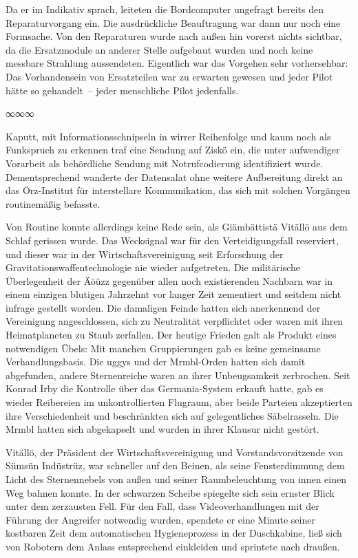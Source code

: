 Da er im Indikativ sprach, leiteten die Bordcomputer ungefragt bereits den Reparaturvorgang ein. Die ausdrückliche Beauftragung war dann nur noch eine Formsache. Von den Reparaturen wurde nach außen hin vorerst nichts sichtbar, da die Ersatzmodule an anderer Stelle aufgebaut wurden und noch keine messbare Strahlung aussendeten. Eigentlich war das Vorgehen sehr vorhersehbar: Das Vorhandensein von Ersatzteilen war zu erwarten gewesen und jeder Pilot hätte so gehandelt~– jeder menschliche Pilot jedenfalls.

\begin{center}
∞∞∞
\end{center}

Kaputt, mit Informationsschnipseln in wirrer Reihenfolge und kaum noch als Funkspruch zu erkennen traf eine Sendung auf Ziskö ein, die unter aufwendiger Vorarbeit als behördliche Sendung mit Notrufcodierung identifiziert wurde. Dementsprechend wanderte der Datensalat ohne weitere Aufbereitung direkt an das Örz-Institut für interstellare Kommunikation, das sich mit solchen Vorgängen routinemäßig befasste.

Von Routine konnte allerdings keine Rede sein, als Giämbättistä Vitällö aus dem Schlaf gerissen wurde. Das Wecksignal war für den Verteidigungsfall reserviert, und dieser war in der Wirtschaftsvereinigung seit Erforschung der Gravitationswaffentechnologie nie wieder aufgetreten. Die militärische Überlegenheit der Äöüzz gegenüber allen noch existierenden Nachbarn war in einem einzigen blutigen Jahrzehnt vor langer Zeit zementiert und seitdem nicht infrage gestellt worden. Die damaligen Feinde hatten sich anerkennend der Vereinigung angeschlossen, sich zu Neutralität verpflichtet oder waren mit ihren Heimatplaneten zu Staub zerfallen. Der heutige Frieden galt als Produkt eines notwendigen Übels: Mit manchen Gruppierungen gab es keine gemeinsame Verhandlungsbasis. Die uggys und der Mrmbl-Orden hatten sich damit abgefunden, andere Sternenreiche waren an ihrer Unbeugsamkeit zerbrochen. Seit Konrad Irby die Kontrolle über das Germania-System erkauft hatte, gab es wieder Reibereien im unkontrollierten Flugraum, aber beide Parteien akzeptierten ihre Verschiedenheit und beschränkten sich auf gelegentliches Säbelrasseln. Die Mrmbl hatten sich abgekapselt und wurden in ihrer Klausur nicht gestört.

Vitällö, der Präsident der Wirtschaftsvereinigung und Vorstandsvorsitzende von Sümsün Indüstrüz, war schneller auf den Beinen, als seine Fensterdimmung dem Licht des Sternennebels von außen und seiner Raumbeleuchtung von innen einen Weg bahnen konnte. In der schwarzen Scheibe spiegelte sich sein ernster Blick unter dem zerzausten Fell. Für den Fall, dass Videoverhandlungen mit der Führung der Angreifer notwendig wurden, spendete er eine Minute seiner kostbaren Zeit dem automatischen Hygieneprozess in der Duschkabine, ließ sich von Robotern dem Anlass entsprechend einkleiden und sprintete nach draußen.

